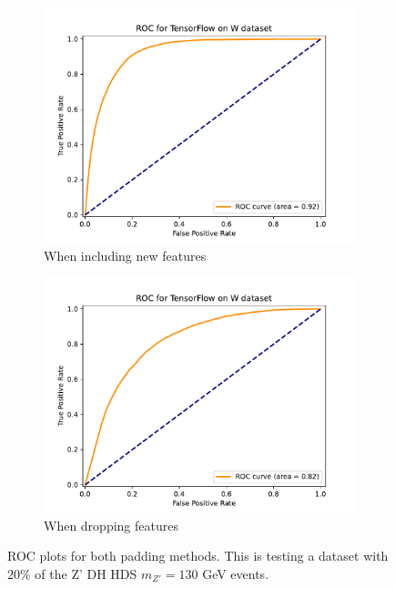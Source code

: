 \documentclass[12pt, a4paper]{book}
\begin{document}
\begin{figure}[!ht]
	\centering
	\begin{subfigure}[b]{0.49\textwidth}
      \centering
      \includegraphics[width=1\textwidth]{New_pad/ROC.pdf}
      \caption{When including new features}
   \end{subfigure}
   \hfill
	\begin{subfigure}[b]{0.49\textwidth}
      \centering
      \includegraphics[width=1\textwidth]{No_pad/ROC.pdf}
      \caption{When dropping features}
   \end{subfigure}
   \caption[ROC plots for both padding methods]{ROC plots for both padding methods.  This is testing a dataset with 20\% of the Z' DH HDS $m_{Z'}=130$ GeV events.}\label{fig:NN_pad_ROC}
\end{figure}
\end{document}

